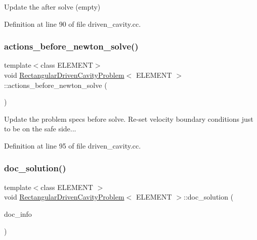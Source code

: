 Update the after solve (empty) 



Definition at line 90 of file driven\+\_\+cavity.\+cc.

\mbox{\label{classRectangularDrivenCavityProblem_ab60d1a663d82616c27b9d11bc46c05a4}} 
\subsubsection{\texorpdfstring{actions\+\_\+before\+\_\+newton\+\_\+solve()}{actions\_before\_newton\_solve()}}
{\footnotesize\ttfamily template$<$class E\+L\+E\+M\+E\+NT$>$ \\
void \hyperlink{classRectangularDrivenCavityProblem}{Rectangular\+Driven\+Cavity\+Problem}$<$ E\+L\+E\+M\+E\+NT $>$\+::actions\+\_\+before\+\_\+newton\+\_\+solve (\begin{DoxyParamCaption}{ }\end{DoxyParamCaption})\hspace{0.3cm}{\ttfamily [inline]}}



Update the problem specs before solve. Re-\/set velocity boundary conditions just to be on the safe side... 



Definition at line 95 of file driven\+\_\+cavity.\+cc.

\mbox{\label{classRectangularDrivenCavityProblem_ab9540b4f539b7d62a1165cc42b4190ea}} 
\subsubsection{\texorpdfstring{doc\+\_\+solution()}{doc\_solution()}}
{\footnotesize\ttfamily template$<$class E\+L\+E\+M\+E\+NT $>$ \\
void \hyperlink{classRectangularDrivenCavityProblem}{Rectangular\+Driven\+Cavity\+Problem}$<$ E\+L\+E\+M\+E\+NT $>$\+::doc\+\_\+solution (\begin{DoxyParamCaption}\item[{Doc\+Info \&}]{doc\+\_\+info }\end{DoxyParamCaption})}



